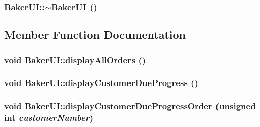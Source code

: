 \hypertarget{class_baker_u_i_915b879a3aa8be3782d3a24fd36fb81d}{
\subsubsection[$\sim$BakerUI]{\setlength{\rightskip}{0pt plus 5cm}Baker\-UI::$\sim$Baker\-UI ()}}
\label{class_baker_u_i_915b879a3aa8be3782d3a24fd36fb81d}




\subsection{Member Function Documentation}
\hypertarget{class_baker_u_i_d69822b9289cd53fa4da8f4f39864d19}{
\subsubsection[displayAllOrders]{\setlength{\rightskip}{0pt plus 5cm}void Baker\-UI::display\-All\-Orders ()}}
\label{class_baker_u_i_d69822b9289cd53fa4da8f4f39864d19}


\hypertarget{class_baker_u_i_00eeac47a993278134a2d8ba936f6f31}{
\subsubsection[displayCustomerDueProgress]{\setlength{\rightskip}{0pt plus 5cm}void Baker\-UI::display\-Customer\-Due\-Progress ()}}
\label{class_baker_u_i_00eeac47a993278134a2d8ba936f6f31}


\hypertarget{class_baker_u_i_9afa245c6153335e553d88f8e7ad2c2e}{
\subsubsection[displayCustomerDueProgressOrder]{\setlength{\rightskip}{0pt plus 5cm}void Baker\-UI::display\-Customer\-Due\-Progress\-Order (unsigned int {\em customer\-Number})}}
\label{class_baker_u_i_9afa245c6153335e553d88f8e7ad2c2e}



